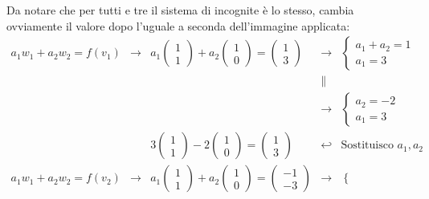 \documentclass[a4paper]{article}
\begin{document}
	\noindent
	Da notare che per tutti e tre il sistema di incognite è lo stesso, cambia ovviamente il valore dopo l'uguale a seconda dell'immagine applicata:
	\begin{equation*}
		\begin{array}{rllll}
			a_{1}w_{1} + a_{2}w_{2} = f\left(v_{1}\right) &\rightarrow& a_{1}\begin{pmatrix}
				1 \\ 1
			\end{pmatrix} + a_{2}\begin{pmatrix}
				1 \\ 0
			\end{pmatrix} = \begin{pmatrix}
				1 \\ 3
			\end{pmatrix} &\rightarrow& \begin{cases}
				a_{1} + a_{2} = 1 \\
				a_{1} = 3
			\end{cases} \\
			&& &\parallel& \\
			&& &\rightarrow& \begin{cases}
				a_{2} = -2 \\
				a_{1} = 3
			\end{cases} \\
			&& 3\begin{pmatrix}
				1 \\ 1
			\end{pmatrix} - 2\begin{pmatrix}
				1 \\ 0
			\end{pmatrix} = \begin{pmatrix}
				1 \\ 3
			\end{pmatrix} &\hookleftarrow& \text{Sostituisco } a_{1},a_{2} \\ [1.8em]
			a_{1}w_{1} + a_{2}w_{2} = f\left(v_{2}\right) &\rightarrow& a_{1}\begin{pmatrix}
				1 \\ 1
			\end{pmatrix} + a_{2}\begin{pmatrix}
				1 \\ 0
			\end{pmatrix} = \begin{pmatrix}
				-1 \\ -3
			\end{pmatrix} &\rightarrow& \begin{cases}

\end{cases}
\end{array}
\end{equation*}
\end{document}
